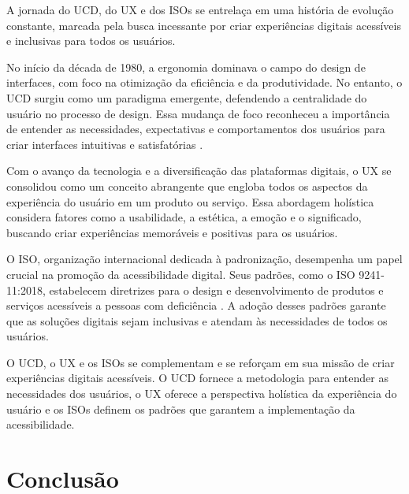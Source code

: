 \documentclass[
  12pt,
  openright,
  twoside,
  a4paper,
  english,
  french,
  spanish,
  brazil
]{abntex2}
\begin{document}
A jornada do UCD, do UX e dos ISOs se entrelaça em uma história de evolução
constante, marcada pela busca incessante por criar experiências digitais
acessíveis e inclusivas para todos os usuários.

No início da década de 1980, a ergonomia dominava o campo do design de
interfaces, com foco na otimização da eficiência e da produtividade. No entanto,
o UCD surgiu como um paradigma emergente, defendendo a centralidade do usuário
no processo de design. Essa mudança de foco reconheceu a importância de entender
as necessidades, expectativas e comportamentos dos usuários para criar
interfaces intuitivas e satisfatórias
\cite{Adriana:A-Closer-Look-on-the-User-Centred-Design}.

Com o avanço da tecnologia e a diversificação das plataformas digitais, o UX se
consolidou como um conceito abrangente que engloba todos os aspectos da
experiência do usuário em um produto ou serviço. Essa abordagem holística
considera fatores como a usabilidade, a estética, a emoção e o significado,
buscando criar experiências memoráveis e positivas para os usuários.

O ISO, organização internacional dedicada à padronização, desempenha um papel
crucial na promoção da acessibilidade digital. Seus padrões, como o ISO
9241-11:2018, estabelecem diretrizes para o design e desenvolvimento de produtos
e serviços acessíveis a pessoas com deficiência \cite{ISO:9241-11:2018}. A
adoção desses padrões garante que as soluções digitais sejam inclusivas e
atendam às necessidades de todos os usuários.

O UCD, o UX e os ISOs se complementam e se reforçam em sua missão de criar
experiências digitais acessíveis. O UCD fornece a metodologia para entender as
necessidades dos usuários, o UX oferece a perspectiva holística da experiência
do usuário e os ISOs definem os padrões que garantem a implementação da
acessibilidade.

\chapter{Conclusão}

\lipsum[31-33]

\postextual


\end{document}
